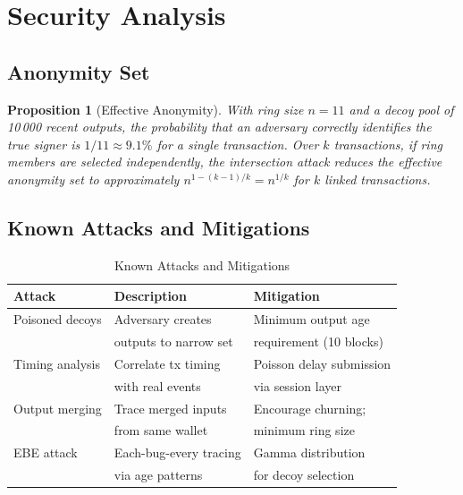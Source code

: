 \documentclass[11pt,a4paper]{article}
\newtheorem{proposition}{Proposition}[section]
\begin{document}
\section{Security Analysis}
\label{sec:security}

\subsection{Anonymity Set}

\begin{proposition}[Effective Anonymity]
    With ring size $n = 11$ and a decoy pool of 10\,000 recent outputs,
    the probability that an adversary correctly identifies the true
    signer is $1/11 \approx 9.1\%$ for a single transaction.  Over $k$
    transactions, if ring members are selected independently, the
    intersection attack reduces the effective anonymity set to
    approximately $n^{1 - (k-1)/k} = n^{1/k}$ for $k$ linked transactions.
\end{proposition}

\subsection{Known Attacks and Mitigations}

\begin{table}[h]
\centering
\caption{Known Attacks and Mitigations}
\label{tab:attacks}
\begin{tabular}{@{}lll@{}}
\toprule
\textbf{Attack} & \textbf{Description} & \textbf{Mitigation} \\
\midrule
Poisoned decoys & Adversary creates & Minimum output age \\
                & outputs to narrow set & requirement (10 blocks) \\
Timing analysis & Correlate tx timing & Poisson delay submission \\
                & with real events    & via session layer \\
Output merging  & Trace merged inputs & Encourage churning; \\
                & from same wallet    & minimum ring size \\
EBE attack      & Each-bug-every tracing & Gamma distribution \\
                & via age patterns    & for decoy selection \\
\bottomrule
\end{tabular}
\end{table}
\end{document}
